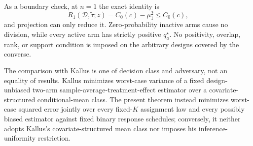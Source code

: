 As a boundary check, at \(n=1\) the exact identity is
\[
 R_1(\mathcal D,\widetilde\tau;z)=C_0(c)-\mu_1^2\leq C_0(c),
\]
and projection can only reduce it.  Zero-probability inactive arms cause no division, while every active arm has strictly positive \(q_a^\star\).  No positivity, overlap, rank, or support condition is imposed on the arbitrary designs covered by the converse.

The comparison with Kallus is one of decision class and adversary, not an equality of results.  Kallus minimizes worst-case variance of a fixed design-unbiased two-arm sample-average-treatment-effect estimator over a covariate-structured conditional-mean class.  The present theorem instead minimizes worst-case squared error jointly over every fixed-\(K\) assignment law and every possibly biased estimator against fixed binary response schedules; conversely, it neither adopts Kallus's covariate-structured mean class nor imposes his inference-uniformity restriction.